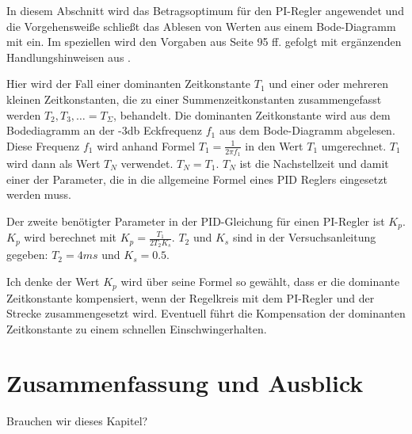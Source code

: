 \documentclass[            %
draft = false,             		%
paper = A4,                		%
pagesize = pdftex,         		%
fontsize = 10pt,           		%
DIV=15,                    		%
twoside = false,           		%
twocolumn = false,         		%
parskip = full,           		%
chapterprefix = false,      		%
appendixprefix = true,     		%
headinclude = false,       		%
footinclude = false,       		%
mpinclude = false,         		%
numbers = auto,            		%
cleardoublepage = plain,   		%
footnotes = multiple,      		%
titlepage = true,          		%
headings = normal,         		%
open = right,              		%
bibliography = openstyle,  		%
listof = chaptergapline,   		%
overfullrule = true,
]{scrbook}
\newcommand{\addtotoc}[1]{
\addcontentsline{toc}{chapter}{
   \texorpdfstring{
      \MakeUppercase{#1}
   }{#1}
   }
}
\begin{document}
In diesem Abschnitt wird das Betragsoptimum für den PI-Regler angewendet und die Vorgehensweiße schließt das Ablesen von Werten aus einem Bode-Diagramm mit ein. 
Im speziellen wird den Vorgaben aus \cite{Skript_Regelungstechnik} Seite 95 ff. gefolgt mit ergänzenden Handlungshinweisen aus \cite{versuchssanleitung}.

Hier wird der Fall einer dominanten Zeitkonstante $T_{1}$ und einer oder mehreren kleinen Zeitkonstanten, die zu einer Summenzeitkonstanten
zusammengefasst werden $T_{2}, T_{3}, \ldots = T_{\Sigma}$, behandelt. Die dominanten Zeitkonstante wird aus dem Bodediagramm an der -3db Eckfrequenz $f_{1}$ aus dem 
Bode-Diagramm abgelesen. Diese Frequenz $f_{1}$ wird anhand Formel $T_{1} = \frac{1}{2 \pi f_{1}}$ in den Wert $T_{1}$ umgerechnet. $T_{1}$ wird dann als Wert $T_{N}$ verwendet.
$T_{N} = T_{1}$. $T_{N}$ ist die Nachstellzeit und damit einer der Parameter, die in die allgemeine Formel eines PID Reglers eingesetzt werden muss.

Der zweite benötigter Parameter in der PID-Gleichung für einen PI-Regler ist $K_{p}$. $K_{p}$ wird berechnet mit $K_{p} = \frac{T_{1}}{2 T_{2} K_{s}}$. 
$T_{2}$ und $K_{s}$ sind in der Versuchsanleitung \cite{versuchssanleitung} gegeben: $T_{2} = 4ms$ und $K_{s} = 0.5$.

Ich denke der Wert $K_{p}$ wird über seine Formel so gewählt, dass er die dominante Zeitkonstante kompensiert, wenn der Regelkreis mit dem PI-Regler und der Strecke
zusammengesetzt wird. Eventuell führt die Kompensation der dominanten Zeitkonstante zu einem schnellen Einschwingerhalten.



\newpage
{\let\clearpage\relax \chapter{Zusammenfassung und Ausblick}} \label{chpt:Conclusion}

Brauchen wir dieses Kapitel?









%
\end{document}

